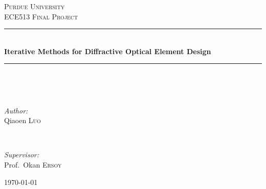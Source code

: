 \documentclass[letter,14pt]{extreport}
\begin{document}
\begin{titlepage}
\begin{center}
\textsc{\LARGE Purdue University}\\[1.0cm]
\textsc{\Large ECE513 Final Project}\\[1cm]
\hrule\hspace*{\fill}\\[0.8cm]
{\LARGE \bfseries Iterative Methods for
Diffractive Optical Element Design}\\[0.7cm]
\hrule\hspace*{\fill}\\[0.8cm]
\begin{minipage}{0.4\textwidth}
\hspace*{\fill}\\
\begin{flushleft} \large
\emph{Author:}\\
Qiaoen \textsc{Luo}\\
\end{flushleft}
\end{minipage}
\begin{minipage}{0.4\textwidth}
\hspace*{\fill}\\
\begin{flushright} \large
\emph{Supervisor:} \\
Prof.~Okan \textsc{Ersoy}
\end{flushright}
\end{minipage}
\vfill
{\large \today}
\end{center}
\end{titlepage}
\begin{abstract}

Diffractive optical elements serve a wide array of purposes in 
optical systems, such as splitting laser beam and correcting aberrations of
a lens. A similar concept, computer generated holography allow 
us to store and reproduce the object's image in 3D, 
offering theoretically much superior experience
than existing 3D visual representations such as 3D movies.
In this report, we compare various iterative Fourier
transform methods used in designing quantized DOEs that are able to 
shape incoming beam to result in a diffraction pattern like
the desired test image, and also in designing quantized
computer generated holograms that store and 
reproduce complex field like the given image. 
The compared iterative methods are Input-Output, Output-Output, 
Modified-Input-Output and Hybrid-Input-Output. We compare
the listed methods in terms of convergence rate by plotting residue at 
each iteration and showcasing the quality of the reconstructed images.

\end{abstract}
\tableofcontents
{}
\end{document}
